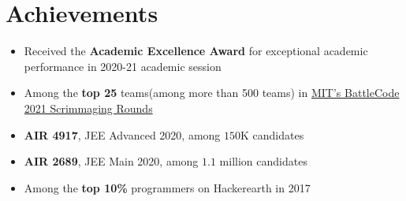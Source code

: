 \section*{\sc Achievements}
\vspace{-2mm}
\hrulefill
\vspace{1mm}

\begin{itemize}
    \item Received the \textbf{Academic Excellence Award} for exceptional academic performance in 2020-21 academic session
    \item Among the \textbf{top 25} teams(among more than 500 teams) in  \href{https://github.com/abhishekshree/BattleCode}{MIT's BattleCode 2021 Scrimmaging Rounds}
    \item \textbf{AIR 4917}, JEE Advanced 2020, among $150$K candidates 
    \item \textbf{AIR 2689}, JEE Main 2020, among $1.1$ million candidates
    \item Among the \textbf{top 10\%} programmers on Hackerearth in 2017
\end{itemize}
